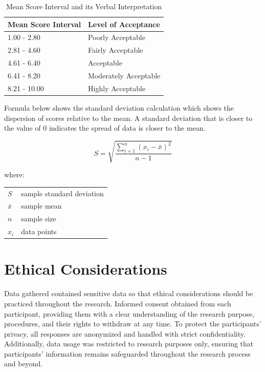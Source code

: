 	\begin{table}[h]
		\centering
		\caption{Mean Score Interval and its Verbal Interpretation}
		\renewcommand{\arraystretch}{1.3}
		\label{Verbal}
			\begin{tabular}{ll}
				\hline
				\multicolumn{1}{l}{\textbf{Mean Score Interval}} & 
				\multicolumn{1}{l}{\textbf{Level of Acceptance}} \\ \hline
				1.00 - 2.80     & Poorly Acceptable            \\ 
				2.81 - 4.60     & Fairly Acceptable  \\ 
				4.61 - 6.40     & Acceptable \\ 
				6.41 - 8.20     & Moderately Acceptable      \\ 
				8.21 - 10.00    & Highly Acceptable\\ \hline
			\end{tabular}
	\end{table}
	
	Formula below shows the standard deviation calculation which shows the dispersion of scores relative to the mean. A standard deviation  that is closer to the value of 0 indicates the spread of data is closer to the mean.
	
	\begin{equation*} 
		\label{stdDev}
		S = \sqrt{\frac{\sum_{i=1}^{n} (x_{i} - \bar{x} )^2 }{n-1}}
	\end{equation*}
	
	\noindent where: \\
	\begin{tabular}{@{}ll}
	$S$ & sample standard deviation \\
	$\bar{x}$ & sample mean \\
	$n$ & sample size \\
	$x_{i}$ & data points \\
	\end{tabular}
	

\section{Ethical Considerations}
	Data gathered contained sensitive data so that ethical considerations should be practiced throughout the research.  Informed consent obtained from each participant, providing them with a clear understanding of the research purpose, procedures, and their rights to withdraw at any time. To protect the participants’ privacy, all responses are anonymized and handled with strict confidentiality. Additionally, data usage was restricted to research purposes only, ensuring that participants' information remains safeguarded throughout the research process and beyond. 
	

